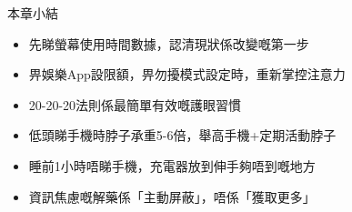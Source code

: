 \begin{tcbsummary}{本章小結}
\begin{itemize}
  \item 先睇螢幕使用時間數據，認清現狀係改變嘅第一步
  \item 畀娛樂App設限額，畀勿擾模式設定時，重新掌控注意力
  \item 20-20-20法則係最簡單有效嘅護眼習慣
  \item 低頭睇手機時脖子承重5-6倍，舉高手機+定期活動脖子
  \item 睡前1小時唔睇手機，充電器放到伸手夠唔到嘅地方
  \item 資訊焦慮嘅解藥係「主動屏蔽」，唔係「獲取更多」
\end{itemize}

\end{tcbsummary}
